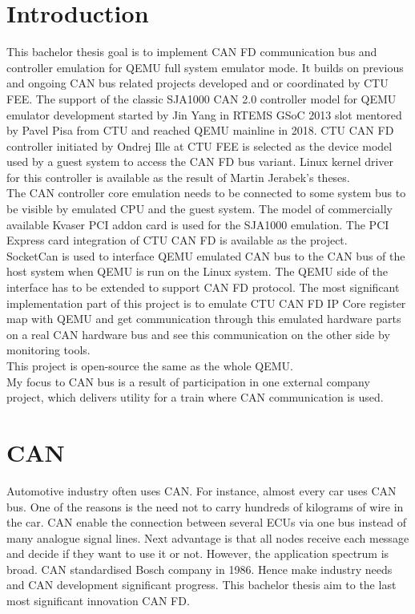 \documentclass{ctuthesis}
\begin{document}
\chapter{Introduction}
 This bachelor thesis goal is to implement CAN FD communication bus and controller emulation for QEMU full system emulator mode. It builds on previous and ongoing CAN bus related projects developed and or coordinated by CTU FEE. The support of the classic SJA1000 CAN 2.0 controller model for QEMU emulator development started by Jin Yang in RTEMS GSoC 2013 slot mentored by Pavel Pisa from CTU and reached QEMU mainline in 2018. \cite{qemu-mainline} CTU CAN FD controller \cite{ctu-canfd-core} initiated by Ondrej Ille at CTU FEE is selected as the device model used by a guest system to access the CAN FD bus variant. Linux kernel driver for this controller is available as the result of Martin Jerabek's theses. \cite{ctu-canfd} \\
 The CAN controller core emulation needs to be connected to some system bus to be visible by emulated CPU and the guest system. The model of commercially available Kvaser PCI addon card is used for the SJA1000 emulation. The PCI Express card integration of CTU CAN FD is available as the project. \cite{ctu-project} \\
 SocketCan is used to interface QEMU emulated CAN bus to the CAN bus of the host system when QEMU is run on the Linux system. The QEMU side of the interface has to be extended to support CAN FD protocol.
 The most significant implementation part of this project is to emulate CTU CAN FD IP Core register map \cite{progdum} with QEMU and get communication through this emulated hardware parts on a real CAN hardware bus and see this communication on the other side by monitoring tools. \\
 This project is open-source the same as the whole QEMU. \\
 My focus to CAN bus is a result of participation in one external company
 project, which delivers utility for a train where CAN communication is used.

\chapter{CAN}
 Automotive industry often uses CAN.  For instance, almost every car uses CAN bus. One of the reasons is the need not to carry hundreds of kilograms of wire in the car. CAN enable the connection between several ECUs via one bus\cite{ECUs} instead of many analogue signal lines. Next advantage is that all nodes receive each message and decide if they want to use it or not. However, the application spectrum is broad. CAN standardised Bosch company in 1986. Hence make industry needs and CAN development significant progress. This bachelor thesis aim to the last most significant innovation CAN FD.
\end{document}
